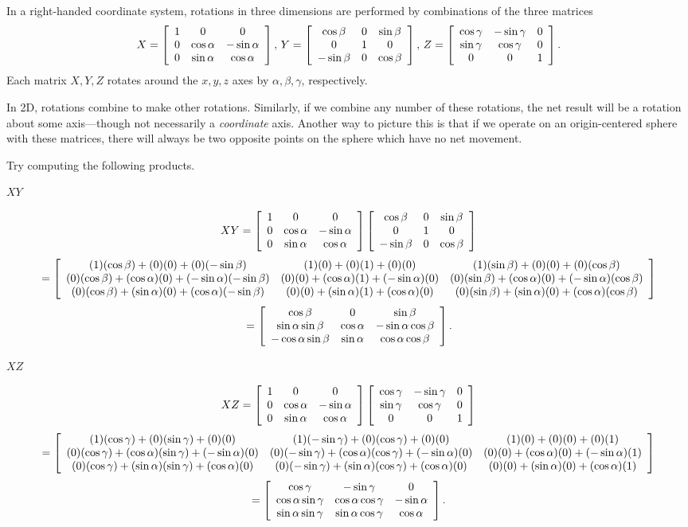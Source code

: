 \documentclass[../key.tex]{subfiles}
\begin{document}
\begin{outer_problem}
\item In a right-handed coordinate system, rotations in three dimensions are performed by combinations of the three matrices
$$X=\left[\begin{array}{ccc} 1 & 0 & 0 \\ 0 & \cos\alpha & -\sin\alpha \\ 0 & \sin\alpha & \cos\alpha \end{array}\right],\, Y=\left[\begin{array}{ccc} \cos\beta & 0 & \sin\beta \\ 0 & 1 & 0 \\ -\sin\beta & 0 & \cos\beta \end{array}\right],\, Z=\left[\begin{array}{ccc} \cos\gamma & -\sin\gamma & 0 \\ \sin\gamma & \cos\gamma & 0 \\ 0 & 0 & 1 \end{array}\right].$$
Each matrix $X,Y,Z$ rotates around the $x,y,z$ axes by $\alpha,\beta,\gamma$, respectively.

In 2D, rotations combine to make other rotations. Similarly, if we combine any number of these rotations, the net result will be a rotation about some axis---though not necessarily a \textit{coordinate} axis. Another way to picture this is that if we operate on an origin-centered sphere with these matrices, there will always be two opposite points on the sphere which have no net movement.

Try computing the following products.
\end{outer_problem}

\begin{inner_problem}[start=1]
\item $XY$
\end{inner_problem}

$$XY = \left[\begin{array}{ccc} 1 & 0 & 0 \\ 0 & \cos\alpha & -\sin\alpha \\ 0 & \sin\alpha & \cos\alpha \end{array}\right]\left[\begin{array}{ccc} \cos\beta & 0 & \sin\beta \\ 0 & 1 & 0 \\ -\sin\beta & 0 & \cos\beta \end{array}\right]$$
$$=\left[\begin{array}{ccc} (1)(\cos\beta) + (0)(0) + (0)(-\sin\beta) & (1)(0) + (0)(1) + (0)(0) & (1)(\sin\beta) + (0)(0) + (0)(\cos\beta) \\ (0)(\cos\beta) + (\cos\alpha)(0) + (-\sin\alpha)(-\sin\beta) & (0)(0) + (\cos\alpha)(1) + (-\sin\alpha)(0) & (0)(\sin\beta) + (\cos\alpha)(0) + (-\sin\alpha)(\cos\beta) \\ (0)(\cos\beta) + (\sin\alpha)(0) + (\cos\alpha)(-\sin\beta) & (0)(0) + (\sin\alpha)(1) + (\cos\alpha)(0) & (0)(\sin\beta) + (\sin\alpha)(0) + (\cos\alpha)(\cos\beta) \end{array}\right]$$
$$=\left[\begin{array}{ccc} \cos\beta & 0 & \sin\beta \\ \sin\alpha\sin\beta & \cos\alpha & -\sin\alpha\cos\beta \\ -\cos\alpha\sin\beta & \sin\alpha & \cos\alpha\cos\beta \end{array}\right].$$

\begin{inner_problem}
\item $XZ$
\end{inner_problem}

$$XZ = \left[\begin{array}{ccc} 1 & 0 & 0 \\ 0 & \cos\alpha & -\sin\alpha \\ 0 & \sin\alpha & \cos\alpha \end{array}\right]\left[\begin{array}{ccc} \cos\gamma & -\sin\gamma & 0 \\ \sin\gamma & \cos\gamma & 0 \\ 0 & 0 & 1 \end{array}\right]$$
$$=\left[\begin{array}{ccc} (1)(\cos\gamma) + (0)(\sin\gamma) + (0)(0) & (1)(-\sin\gamma) + (0)(\cos\gamma) + (0)(0) & (1)(0) + (0)(0) + (0)(1) \\ (0)(\cos\gamma) + (\cos\alpha)(\sin\gamma) + (-\sin\alpha)(0) & (0)(-\sin\gamma) + (\cos\alpha)(\cos\gamma) + (-\sin\alpha)(0) & (0)(0) + (\cos\alpha)(0) + (-\sin\alpha)(1) \\ (0)(\cos\gamma) + (\sin\alpha)(\sin\gamma) + (\cos\alpha)(0) & (0)(-\sin\gamma) + (\sin\alpha)(\cos\gamma) + (\cos\alpha)(0) & (0)(0) + (\sin\alpha)(0) + (\cos\alpha)(1) \end{array}\right]$$
$$=\left[\begin{array}{ccc} \cos\gamma & -\sin\gamma & 0 \\ \cos\alpha\sin\gamma & \cos\alpha\cos\gamma & -\sin\alpha \\ \sin\alpha\sin\gamma & \sin\alpha\cos\gamma & \cos\alpha \end{array}\right].$$
\end{document}
